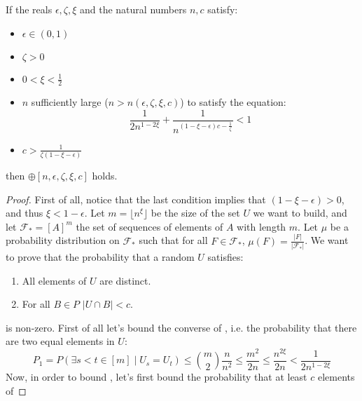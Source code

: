     \begin{lemma}[Lemma 4.19] \label{lem:n_large_enough_valid_values}
        If the reals $\epsilon, \zeta, \xi$ and the natural numbers $n, c$ satisfy:
        \begin{itemize}
            \item $\epsilon \in (0,1)$
            \item $\zeta > 0$
            \item $0 < \xi < \frac{1}{2}$
            \item $n$ sufficiently large ($n > n(\epsilon, \zeta, \xi, c)$) to satisfy the equation:
            \[
                \frac{1}{2n^{1-2\xi}} + \frac{1}{n^{(1 - \xi - \epsilon)c - \frac{1}{\zeta}}} < 1
            \]
            \item $c > \frac{1}{\zeta (1 - \xi - \epsilon)}$
        \end{itemize}
        then $\oplus[n, \epsilon, \zeta, \xi, c]$ holds.
        \begin{proof}
            First of all, notice that the last condition implies that $(1 - \xi - \epsilon) > 0$, and thus $\xi < 1 -\epsilon$.
            Let $m = \lfloor n^\xi \rfloor$ be the size of the set $U$ we want to build, and let $\mathcal{F}_* = [A]^m$
            the set of sequences of elements of $A$ with length $m$.
            Let $\mu$ be a probability distribution on $\mathcal{F}_*$ such that for all $F \in \mathcal{F}_*$,
            $\mu(F) = \frac{|F|}{|\mathcal{F}_*|}$.
            We want to prove that the probability that a random $U$ satisfies:
            \begin{enumerate}
                \item\label{itm:n_large_enough_valid_values.1} All elements of $U$ are distinct.
                \item\label{itm:n_large_enough_valid_values.2} For all $B \in P$ $|U \cap B| < c$.
            \end{enumerate}
            is non-zero.
            First of all let's bound the converse of , i.e. the probability that there are two equal elements
            in $U$:
            \[
                P_1 = P(\exists s < t \in [m] \mid U_s = U_t)
                    \leq {m \choose 2} \frac{n}{n^2}
                    \leq \frac{m^2}{2n}
                    \leq \frac{n^{2\xi}}{2n}
                    < \frac{1}{2n^{1-2\xi}}
            \]
            Now, in order to bound , let's first bound the probability that at least $c$ elements of

\end{proof}
\end{lemma}

